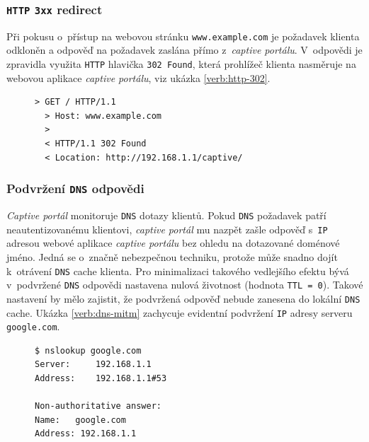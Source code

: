 \documentclass[thesis=M,czech]{FITthesis}[2012/10/20]
\renewcommand{\lstlistingname}{Ukázka kódu}
\begin{document}
\subsubsection{\texttt{HTTP} \texttt{3xx} redirect}
Při pokusu o~přístup na webovou stránku \texttt{www.example.com} je požadavek klienta odkloněn a odpověď na požadavek zaslána přímo z~\textit{captive portálu}. V~odpovědi je zpravidla využita \texttt{HTTP} hlavička \texttt{302 Found}, která prohlížeč klienta nasměruje na webovou aplikace \textit{captive portálu}, viz ukázka \ref{verb:http-302}.

\begin{figure}[h]
  \renewcommand{\lstlistingname}{Ukázka}
  \begin{lstlisting}[label=verb:http-302, caption={Ukázka přesměrování \texttt{HTTP} požadavku (zkráceno)},frame=single]
  > GET / HTTP/1.1
  > Host: www.example.com
  >
  < HTTP/1.1 302 Found
  < Location: http://192.168.1.1/captive/
  \end{lstlisting}
\end{figure}


\subsubsection{Podvržení \texttt{DNS} odpovědi}

\textit{Captive portál} monitoruje \texttt{DNS} dotazy klientů. Pokud \texttt{DNS} požadavek patří neautentizovanému klientovi, \textit{captive portál} mu nazpět zašle odpověď s~\texttt{IP} adresou webové aplikace \textit{captive portálu} bez ohledu na dotazované doménové jméno. Jedná se o~značně nebezpečnou techniku, protože může snadno dojít k~otrávení \texttt{DNS} cache klienta. Pro minimalizaci takového vedlejšího efektu bývá v~podvržené \texttt{DNS} odpovědi nastavena nulová životnost (hodnota \texttt{TTL = 0}). Takové nastavení by mělo zajistit, že podvržená odpověď nebude zanesena do lokální \texttt{DNS} cache. Ukázka \ref{verb:dns-mitm} zachycuje evidentní podvržení \texttt{IP} adresy serveru \texttt{google.com}.

\begin{figure}[h]
  \renewcommand{\lstlistingname}{Ukázka}
  \begin{lstlisting}[label=verb:dns-mitm, caption={Ukázka podvržení \texttt{DNS} odpovědi},frame=single]
$ nslookup google.com
Server:		192.168.1.1
Address:	192.168.1.1#53

Non-authoritative answer:
Name:	google.com
Address: 192.168.1.1
  \end{lstlisting}
\end{figure}
\end{document}
